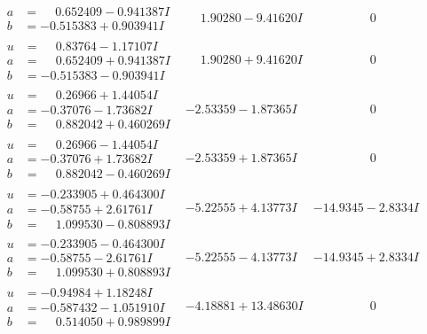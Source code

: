 \documentclass[1p]{elsarticle_modified}
\theoremstyle{definition}
\begin{document}
$$\begin{array}{c|c|c}
\begin{aligned}
a &= \phantom{-}0.652409 - 0.941387 I \\
b &= -0.515383 + 0.903941 I\end{aligned}
 & \phantom{-}1.90280 - 9.41620 I & \phantom{-0.000000 } 0 \\ \hline\begin{aligned}
u &= \phantom{-}0.83764 - 1.17107 I \\
a &= \phantom{-}0.652409 + 0.941387 I \\
b &= -0.515383 - 0.903941 I\end{aligned}
 & \phantom{-}1.90280 + 9.41620 I & \phantom{-0.000000 } 0 \\ \hline\begin{aligned}
u &= \phantom{-}0.26966 + 1.44054 I \\
a &= -0.37076 - 1.73682 I \\
b &= \phantom{-}0.882042 + 0.460269 I\end{aligned}
 & -2.53359 - 1.87365 I & \phantom{-0.000000 } 0 \\ \hline\begin{aligned}
u &= \phantom{-}0.26966 - 1.44054 I \\
a &= -0.37076 + 1.73682 I \\
b &= \phantom{-}0.882042 - 0.460269 I\end{aligned}
 & -2.53359 + 1.87365 I & \phantom{-0.000000 } 0 \\ \hline\begin{aligned}
u &= -0.233905 + 0.464300 I \\
a &= -0.58755 + 2.61761 I \\
b &= \phantom{-}1.099530 - 0.808893 I\end{aligned}
 & -5.22555 + 4.13773 I & -14.9345 - 2.8334 I \\ \hline\begin{aligned}
u &= -0.233905 - 0.464300 I \\
a &= -0.58755 - 2.61761 I \\
b &= \phantom{-}1.099530 + 0.808893 I\end{aligned}
 & -5.22555 - 4.13773 I & -14.9345 + 2.8334 I \\ \hline\begin{aligned}
u &= -0.94984 + 1.18248 I \\
a &= -0.587432 - 1.051910 I \\
b &= \phantom{-}0.514050 + 0.989899 I\end{aligned}
 & -4.18881 + 13.48630 I & \phantom{-0.000000 } 0 \\ \hline\begin{aligned}

\end{aligned}
\end{array}$$
\end{document}
